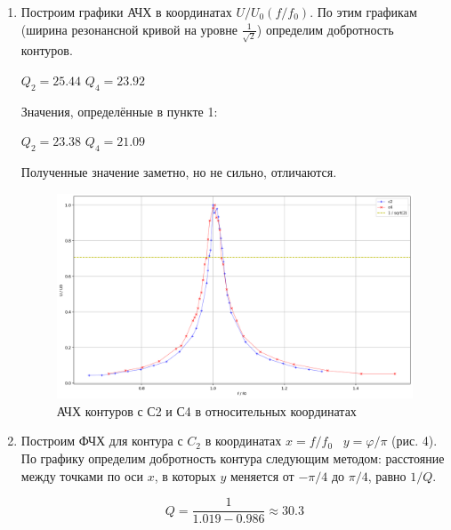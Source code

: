 \documentclass[a4paper]{article}
\begin{document}
\begin{enumerate}
    \item Построим графики АЧХ в координатах $U/U_0(f/f_0)$. По этим графикам (ширина резонансной кривой на уровне $\frac{1}{\sqrt{2}}$) определим добротность контуров.
          \begin{center}
              $Q_2 = 25.44$ \hspace{1cm} $Q_4 = 23.92$
          \end{center}

          Значения, определённые в пункте 1:

          \begin{center}
              $Q_2 = 23.38$ \hspace{1cm} $Q_4 = 21.09$
          \end{center}

          Полученные значение заметно, но не сильно, отличаются.

          \begin{figure}[H]
              \centering
              \includegraphics[width=\textwidth]{graph2.png}
              \caption{АЧХ контуров с С2 и С4 в относительных координатах}
              \label{fig:vac1}
          \end{figure}


    \item Построим ФЧХ для контура с $C_2$ в координатах $x = f/f_0 \;\;\; y = \varphi/\pi   $ (рис. 4). По графику определим добротность контура следующим методом: расстояние между точками по оси $x$, в которых $y$ меняется от $-\pi/4$ до $\pi/4$, равно $1/Q$.

          $$Q = \frac{1}{1.019-0.986} \approx 30.3$$


\end{enumerate}
\end{document}
